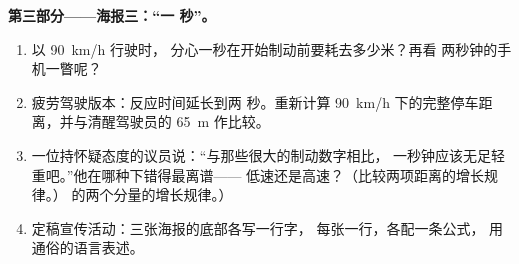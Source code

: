 \begin{problem}
\medskip\noindent\textbf{第三部分——海报三：“一
秒”。}
\begin{enumerate}[resume]
  \item 以 \qty{90}{km/h} 行驶时，
        分心一秒在开始制动前要耗去多少米？再看
        两秒钟的手机一瞥呢？
  \item 疲劳驾驶版本：反应时间延长到两
        秒。重新计算
        \qty{90}{km/h} 下的完整停车距离，并与清醒驾驶员的
        \qty{65}{m} 作比较。
  \item 一位持怀疑态度的议员说：“与那些很大的制动数字相比，
        一秒钟应该无足轻重吧。”他在哪种下错得最离谱——
        低速还是高速？（比较两项距离的增长规律。）
        的两个分量的增长规律。）
  \item 定稿宣传活动：三张海报的底部各写一行字，
        每张一行，各配一条公式，
        用通俗的语言表述。
\end{enumerate}
\end{problem}
